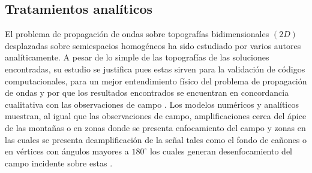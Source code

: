 \documentclass[spanish,letterpaper,12pt,twoside,openany]{article}
\begin{document}
\subsection{Tratamientos analíticos}
%
El problema de propagación de ondas sobre topografías bidimensionales $\left(2D\right)$ desplazadas sobre semiespacios homogéneos ha sido estudiado por varios autores analíticamente. A pesar de lo simple de las topografías de las soluciones encontradas, su estudio se justifica pues estas sirven para la validación de códigos computacionales, para un mejor entendimiento físico del problema de propagación de ondas y por que los resultados encontrados se encuentran en concordancia cualitativa con las observaciones de campo \citep{Geli1988, assimaki2005effects}. Los modelos numéricos y analíticos muestran, al igual que las observaciones de campo, amplificaciones cerca del ápice de las montañas o en zonas donde se presenta enfocamiento del campo \citep{Geli1988} y zonas en las cuales se presenta deamplificación de la señal tales como el fondo de cañones o en vértices con ángulos mayores a $180^\circ$ los cuales generan desenfocamiento del campo incidente sobre estas \citep{assimaki2005effects}.
\end{document}
